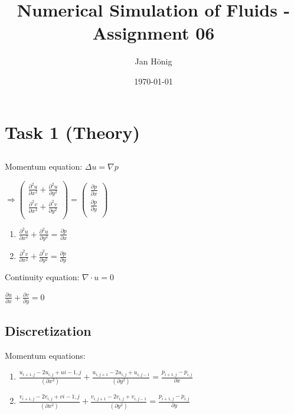 \documentclass[a4paper,11pt]{scrartcl}
\title{Numerical Simulation of Fluids - Assignment 06}
\author{Jan H\"onig}
\date{\today}
\begin{document}
\maketitle


\section{Task 1 (Theory)}
\subsection{}
Momentum equation:  $\Delta u = \nabla p$

$ \Rightarrow
   \begin{pmatrix}
      \frac{\partial^2 u}{\partial x^2} + \frac{\partial^2 u}{\partial y^2} \\
      \frac{\partial^2 v}{\partial x^2} + \frac{\partial^2 v}{\partial y^2} \\
   \end{pmatrix}
   =
   \begin{pmatrix}
      \frac{\partial p}{\partial x} \\
      \frac{\partial p}{\partial y} \\
   \end{pmatrix}
$
\begin{enumerate}
   \item $\frac{\partial^2 u}{\partial x^2} + \frac{\partial^2 u}{\partial y^2} = \frac{\partial p}{\partial x}$
   \item $\frac{\partial^2 v}{\partial x^2} + \frac{\partial^2 v}{\partial y^2} = \frac{\partial p}{\partial y}$
\end{enumerate}

Continuity equation: $\nabla \cdot u = 0$

$\frac{\partial u}{\partial x} + \frac{\partial v}{\partial y} = 0$

\subsection{Discretization}
Momentum equations:
\begin{enumerate}
   \item $\frac{u_{i+1,j} - 2u_{i,j} + u{i-1,j}}{(\partial x^2)} + \frac{u_{i,j+1} - 2u_{i,j} + u_{i,j-1}}{(\partial y^2)} = \frac{p_{i+1,j} - p_{i,j}}{\partial x}$
   \item $\frac{v_{i+1,j} - 2v_{i,j} + v{i-1,j}}{(\partial x^2)} + \frac{v_{i,j+1} - 2v_{i,j} + v_{i,j-1}}{(\partial y^2)} = \frac{p_{i+1,j} - p_{i,j}}{\partial y}$
\end{enumerate}
\end{document}
